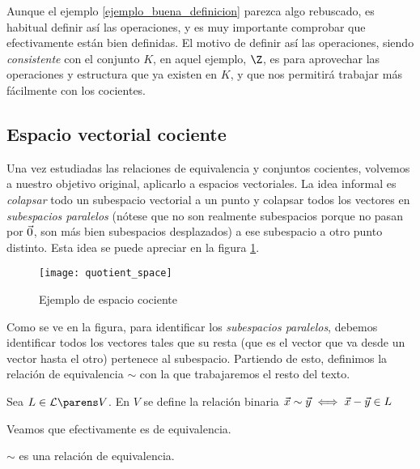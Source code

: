 \documentclass[../algebra_lineal.tex]{subfiles}
\begin{document}
Aunque el ejemplo \ref{ejemplo_buena_definicion} parezca algo rebuscado, es habitual definir así las operaciones, y es muy importante comprobar que efectivamente están bien definidas. El motivo de definir así las operaciones, siendo \textit{consistente} con el conjunto $K$, en aquel ejemplo, $\Z$, es para aprovechar las operaciones y estructura que ya existen en $K$, y que nos permitirá trabajar más fácilmente con los cocientes.

\subsection{Espacio vectorial cociente}

Una vez estudiadas las relaciones de equivalencia y conjuntos cocientes, volvemos a nuestro objetivo original, aplicarlo a espacios vectoriales. La idea informal es \textit{colapsar} todo un subespacio vectorial a un punto y colapsar todos los vectores en \textit{subespacios paralelos} (nótese que no son realmente subespacios porque no pasan por $\vec{0}$, son más bien subespacios desplazados) a ese subespacio a otro punto distinto. Esta idea se puede apreciar en la figura \ref{quotient_space_picture}.

\begin{figure}[h]
    \centering
    \texttt{[image: quotient\_space]}
    \caption{Ejemplo de espacio cociente}
    \label{quotient_space_picture}
\end{figure}

Como se ve en la figura, para identificar los \textit{subespacios paralelos}, debemos identificar todos los vectores tales que su resta (que es el vector que va desde un vector hasta el otro) pertenece al subespacio. Partiendo de esto, definimos la relación de equivalencia $\sim$ con la que trabajaremos el resto del texto.

\begin{definition}
    Sea $L \in \subespaciosde{V}$. En $V$ se define la relación binaria $\vec{x} \sim \vec{y} \iff \vec{x} - \vec{y} \in L$ 
\end{definition}

Veamos que efectivamente es de equivalencia.

\begin{proposition}
    $\sim$ es una relación de equivalencia. 
\end{proposition}
\end{document}
